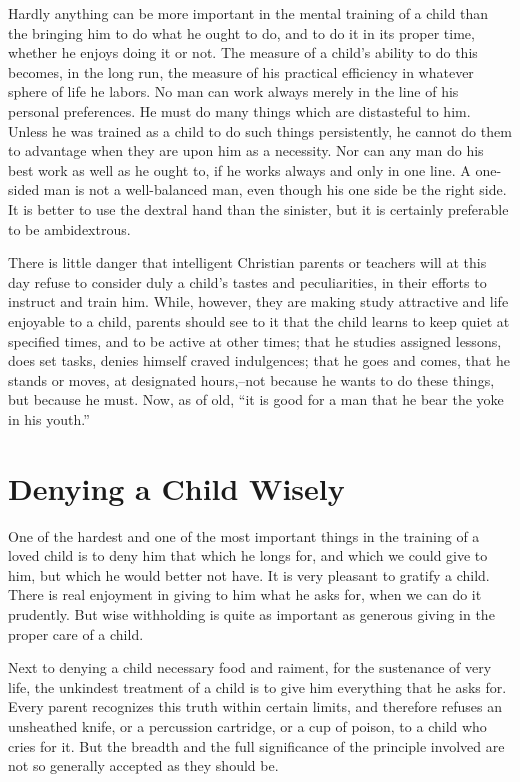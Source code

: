 \documentclass[
]{book}
\begin{document}
Hardly anything can be more important in the mental training of a child than the bringing him to do what he ought to do, and to do it in its proper time, whether he enjoys doing it or not. The measure of a child's ability to do this becomes, in the long run, the measure of his practical efficiency in whatever sphere of life he labors. No man can work always merely in the line of his personal preferences. He must do many things which are distasteful to him. Unless he was trained as a child to do such things persistently, he cannot do them to advantage when they are upon him as a necessity. Nor can any man do his best work as well as he ought to, if he works always and only in one line. A one-sided man is not a well-balanced man, even though his one side be the right side. It is better to use the dextral hand than the sinister, but it is certainly preferable to be ambidextrous.

There is little danger that intelligent Christian parents or teachers will at this day refuse to consider duly a child's tastes and peculiarities, in their efforts to instruct and train him. While, however, they are making study attractive and life enjoyable to a child, parents should see to it that the child learns to keep quiet at specified times, and to be active at other times; that he studies assigned lessons, does set tasks, denies himself craved indulgences; that he goes and comes, that he stands or moves, at designated hours,--not because he wants to do these things, but because he must. Now, as of old, ``it is good for a man that he bear the yoke in his youth.''

\hypertarget{denying-a-child-wisely}{%
\chapter{Denying a Child Wisely}\label{denying-a-child-wisely}}

One of the hardest and one of the most important things in the training of a loved child is to deny him that which he longs for, and which we could give to him, but which he would better not have. It is very pleasant to gratify a child. There is real enjoyment in giving to him what he asks for, when we can do it prudently. But wise withholding is quite as important as generous giving in the proper care of a child.

Next to denying a child necessary food and raiment, for the sustenance of very life, the unkindest treatment of a child is to give him everything that he asks for. Every parent recognizes this truth within certain limits, and therefore refuses an unsheathed knife, or a percussion cartridge, or a cup of poison, to a child who cries for it. But the breadth and the full significance of the principle involved are not so generally accepted as they should be.
\end{document}
